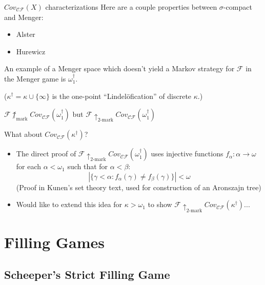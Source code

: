 \documentclass{beamer}
\theoremstyle{theorem}
\theoremstyle{definition}
\newcommand{\markwin}{\uparrow_{\text{mark}}}
\newcommand{\kmarkwin}[1]{\uparrow_{#1\text{-mark}}}
\newcommand{\oneptlind}[1]{#1^\dagger}
\newcommand{\mengame}[1]{Cov_{\pl C\pl F}(#1)}
\newcommand{\<}{\langle}
\renewcommand{\>}{\rangle}
\newcommand{\pl}[1]{\mathscr{#1}}
\begin{document}
\begin{frame}{$\mengame{X}$ characterizations}
Here are a couple properties between $\sigma$-compact and Menger:
  \begin{itemize}
    \item Alster
    \item Hurewicz
  \end{itemize}

\pause

An example of a Menger space which doesn't yield a Markov strategy for $\pl F$ in the Menger game is $\oneptlind{\omega_1}$. 

{\tiny ($\oneptlind{\kappa}=\kappa\cup\{\infty\}$ is the one-point ``Lindel\"ofication'' of discrete $\kappa$.)}

\begin{theorem}
$\pl F\not\markwin\mengame{\oneptlind{\omega_1}}$ but $\pl F\kmarkwin{2}\mengame{\oneptlind{\omega_1}}$
\end{theorem}
\end{frame}

\begin{frame}{What about $\mengame{\oneptlind{\kappa}}$?}
  \begin{itemize}
    \item The direct proof of $\pl F\kmarkwin{2}\mengame{\oneptlind{\omega_1}}$ uses injective functions $f_\alpha:\alpha\to\omega$ for each $\alpha<\omega_1$ such that for $\alpha<\beta$:
      \[
        |\{\gamma<\alpha: f_\alpha(\gamma)\not=f_\beta(\gamma)\}|<\omega
      \]
      (Proof in Kunen's set theory text, used for construction of an Aronszajn tree)
    \pause
    \item Would like to extend this idea for $\kappa>\omega_1$ to show $\pl F\kmarkwin{2}\mengame{\oneptlind{\kappa}}$...
  \end{itemize}
\end{frame}

\section{Filling Games}

\subsection{Scheeper's Strict Filling Game}
\end{document}
